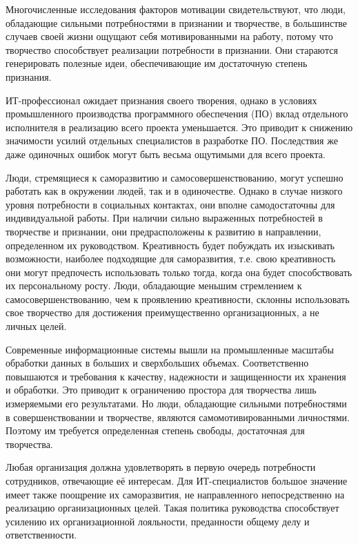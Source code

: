 \documentclass{../industrial-development}
\begin{document}
\lecturenotes

Многочисленные исследования факторов мотивации свидетельствуют, что люди, обладающие сильными потребностями в признании и творчестве, в большинстве случаев своей жизни ощущают себя мотивированными на работу, потому что творчество способствует реализации потребности в признании. Они стараются генерировать полезные идеи, обеспечивающие им достаточную степень признания.

ИТ-профессионал ожидает признания своего творения, однако в условиях промышленного производства программного обеспечения (ПО) вклад отдельного исполнителя в реализацию всего проекта уменьшается. Это приводит к снижению значимости усилий отдельных специалистов в разработке ПО. Последствия же даже одиночных ошибок могут быть весьма ощутимыми для всего проекта.

Люди, стремящиеся к саморазвитию и самосовершенствованию, могут успешно работать как в окружении людей, так и в одиночестве. Однако в случае низкого уровня потребности в социальных контактах, они вполне самодостаточны для индивидуальной работы. При наличии сильно выраженных потребностей в творчестве и признании, они предрасположены к развитию в направлении, определенном их руководством. Креативность будет побуждать их изыскивать возможности, наиболее подходящие для саморазвития, т.е. свою креативность они могут предпочесть использовать только тогда, когда она будет способствовать их персональному росту. Люди, обладающие меньшим стремлением к самосовершенствованию, чем к проявлению креативности, склонны использовать свое творчество для достижения преимущественно организационных, а не личных целей.

Современные информационные системы вышли на промышленные масштабы обработки данных в больших и сверхбольших объемах. Соответственно повышаются и требования к качеству, надежности и защищенности их хранения и обработки. Это приводит к ограничению простора для творчества лишь измеряемыми его результатами. Но люди, обладающие сильными потребностями в совершенствовании и творчестве, являются самомотивированными личностями. Поэтому им требуется определенная степень свободы, достаточная для творчества.

Любая организация должна удовлетворять в первую очередь потребности сотрудников, отвечающие её интересам. Для ИТ-специалистов большое значение имеет также поощрение их саморазвития, не направленного непосредственно на реализацию организационных целей. Такая политика руководства способствует усилению их организационной лояльности, преданности общему делу и ответственности.
\end{document}

